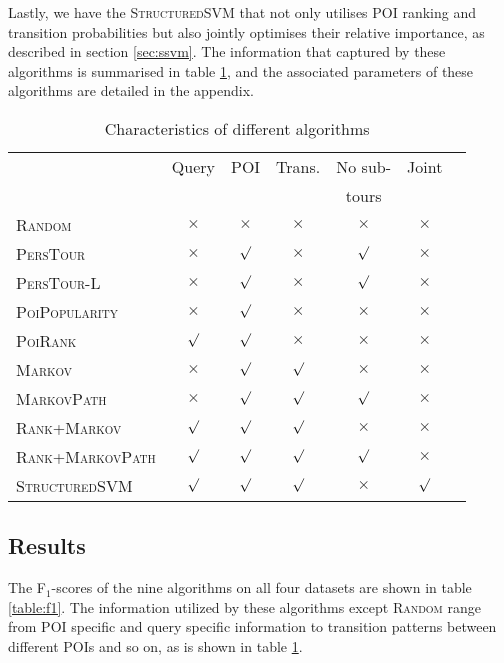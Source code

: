 Lastly, we have the \textsc{StructuredSVM} that not only utilises POI ranking and transition probabilities but also 
jointly optimises their relative importance, as described in section \ref{sec:ssvm}.
The information that captured by these algorithms is summarised in table \ref{tab:characteristic},
and the associated parameters of these algorithms are detailed in the appendix.


\begin{table}
\centering\small
\begin{tabular}{l|cccccc} \hline
                                    & Query    & POI      & Trans. & No sub- & Joint    \\
                                    &     &       &  & tours &     \\ \hline
\textsc{Random}                     & $\times$ & $\times$ & $\times$   & $\times$     & $\times$ \\
\textsc{PersTour}\cite{ijcai15}     & $\times$ & $\surd$  & $\times$   & $\surd$      & $\times$ \\
\textsc{PersTour-L}                 & $\times$ & $\surd$  & $\times$   & $\surd$      & $\times$ \\
\textsc{PoiPopularity}              & $\times$ & $\surd$  & $\times$   & $\times$     & $\times$ \\
\textsc{PoiRank}                    & $\surd$  & $\surd$  & $\times$   & $\times$     & $\times$ \\
\textsc{Markov}                     & $\times$ & $\surd$  & $\surd$    & $\times$     & $\times$ \\
\textsc{MarkovPath}                 & $\times$ & $\surd$  & $\surd$    & $\surd$      & $\times$ \\
\textsc{Rank}+\textsc{Markov}     & $\surd$  & $\surd$  & $\surd$    & $\times$     & $\times$ \\
\textsc{Rank}+\textsc{MarkovPath} & $\surd$  & $\surd$  & $\surd$    & $\surd$      & $\times$ \\
\textsc{StructuredSVM}              & $\surd$  & $\surd$  & $\surd$    & $\times$     & $\surd$  \\ \hline
\end{tabular}
\caption{Characteristics of different algorithms}
\label{tab:characteristic}
\end{table}


\subsection{Results}
The F$_1$-scores of the nine algorithms on all four datasets are shown in table \ref{table:f1}.
The information utilized by these algorithms except \textsc{Random} range from POI specific and query specific
information to transition patterns between different POIs and so on, as is shown in table \ref{tab:characteristic}.

